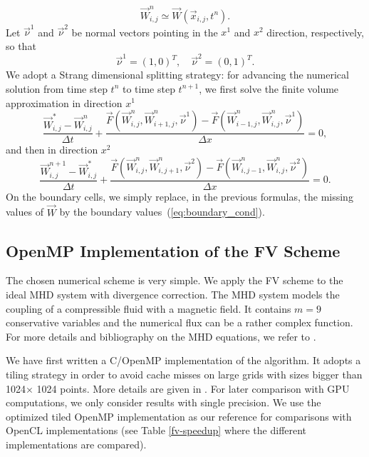 \documentclass{svmult}
\begin{document}
\begin{equation}
  \vec{W}^n_{i,j}\simeq \vec{W}(\vec{x}_{i,j},t^n).
\end{equation}
Let $\vec{\nu}^1$ and $\vec{\nu}^2$ be normal vectors pointing in the
$x^1$ and $x^2$ direction, respectively, so that
\begin{equation}
  \vec{\nu}^1=(1,0)^T,\quad \vec{\nu}^2=(0,1)^T.
\end{equation}
We adopt a Strang dimensional splitting strategy: for advancing the
numerical solution from time step $t^n$ to time step $t^{n+1}$, we
first solve the finite volume approximation in direction $x^1$
\begin{equation}
  \frac{\vec{W}_{i,j}^{*}-\vec{W}_{i,j}^{n}}{\Delta t}+\frac{\vec{F}(\vec{W}^n_{i,j},\vec{W}^n_{i+1,j},\vec{\nu}^1)-\vec{F}(\vec{W}^n_{i-1,j},\vec{W}^n_{i,j},\vec{\nu}^1)}{\Delta x}=0,
\label{eq:x-step}
\end{equation}
and then in direction $x^2$
\begin{equation}
  \frac{\vec{W}_{i,j}^{n+1}-\vec{W}_{i,j}^{*}}{\Delta t}+\frac{\vec{F}(\vec{W}^n_{i,j},\vec{W}^n_{i,j+1},\vec{\nu}^2)-\vec{F}(\vec{W}^n_{i,j-1},\vec{W}^n_{i,j},\vec{\nu}^2)}{\Delta x}=0.
\label{eq:y-step}
\end{equation}
On the boundary cells, we simply replace, in the previous formulas,
the missing values of $\vec{W}$ by the boundary
values~(\ref{eq:boundary_cond}).

\subsection{OpenMP Implementation of the FV Scheme}
The chosen numerical scheme is very simple. We apply the FV scheme to
the ideal MHD system with divergence correction. The MHD system models
the coupling of a compressible fluid with a magnetic field. It
contains $m=9$ conservative variables and the numerical flux can be a
rather complex function. For more details and bibliography on the MHD
equations, we refer to \cite{massaro2014numerical}.

We have first written a C/OpenMP implementation of the algorithm. It
adopts a tiling strategy in order to avoid cache misses on large grids
with sizes bigger than 1024$\times$ 1024 points.  More details are
given in \cite{massaro2014numerical}. For later comparison with GPU
computations, we only consider results with single precision. We use
the optimized tiled OpenMP implementation as our reference for
comparisons with OpenCL implementations (see Table \ref{fv-speedup}
where the different implementations are compared).
\end{document}
